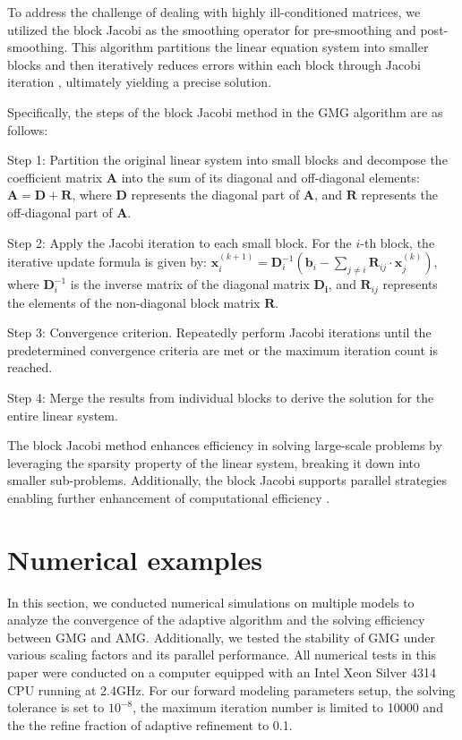 \documentclass[extra, referee]{gji}
\begin{document}
To address the challenge of dealing with highly ill-conditioned matrices, we
utilized the block Jacobi \citep{Elsner1991} as the smoothing operator for
pre-smoothing and post-smoothing. This algorithm partitions the linear equation
system into smaller blocks and then iteratively reduces errors within each block
through Jacobi iteration \citep{Chow2018,CheikAhamed2012}, ultimately yielding a
precise solution.

Specifically, the steps of the block Jacobi method in the GMG algorithm are as
follows:

Step 1: Partition the original linear system into small blocks and decompose the
coefficient matrix $\mathbf{A}$ into the sum of its diagonal and off-diagonal
elements: $\mathbf{A}=\mathbf{D}+\mathbf{R}$, where $\mathbf{D}$ represents the
diagonal part of $\mathbf{A}$, and $\mathbf{R}$ represents the off-diagonal part
of $\mathbf{A}$.

Step 2: Apply the Jacobi iteration to each small block. For the $i$-th block,
the iterative update formula is given by: $\mathbf{x}^{(k+1)}_i =
\mathbf{D}_i^{-1} \left(\mathbf{b}_i - \sum_{j \neq i} \mathbf{R}_{ij} \cdot
\mathbf{x}_j^{(k)}\right)$, where $\mathbf{D}_i^{-1}$ is the inverse matrix of
the diagonal matrix $\mathbf{D_i}$, and $\mathbf{R}_{ij}$ represents the
elements of the non-diagonal block matrix $\mathbf{R}$.

Step 3: Convergence criterion. Repeatedly perform Jacobi iterations until the
predetermined convergence criteria are met or the maximum iteration count is
reached.

Step 4: Merge the results from individual blocks to derive the solution for the
entire linear system.

The block Jacobi method enhances efficiency in solving large-scale problems by
leveraging the sparsity property of the linear system, breaking it down into
smaller sub-problems. Additionally, the block Jacobi supports parallel
strategies enabling further enhancement of computational efficiency
\citep{Beka2010,Beka2003}.

\section{Numerical examples}
In this section, we conducted numerical simulations on multiple models to
analyze the convergence of the adaptive algorithm and the solving efficiency
between GMG and AMG. Additionally, we tested the stability of GMG under various
scaling factors and its parallel performance. All numerical tests in this paper
were conducted on a computer equipped with an Intel Xeon Silver 4314 CPU running
at 2.4GHz. For our forward modeling parameters setup,  the solving tolerance is
set to ${10}^{-8}$, the maximum iteration number is limited to 10000 and the the
refine fraction of adaptive refinement to 0.1.
\end{document}

